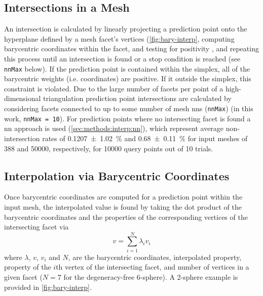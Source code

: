 \subsection{Intersections in a  Mesh}
\label{app:bary-int}
An intersection is calculated by linearly projecting a prediction point onto the hyperplane defined by a mesh facet's vertices (\cref{fig:bary-interp}, computing barycentric coordinates within the facet, and testing for positivity \cite{langerSphericalBarycentricCoordinates2006}, and repeating this process until an intersection is found or a stop condition is reached (see \texttt{nnMax} below). If the prediction point is contained within the simplex, all of the barycentric weights (i.e. coordinates) are positive. If it outside the simplex, this constraint is violated. Due to the large number of facets per point of a high-dimensional
triangulation
prediction point intersections are calculated by considering facets connected to up to some number of mesh \glspl{nn} (\texttt{nnMax}) (in this work, \texttt{nnMax = 10}). For prediction points where no intersecting facet is found
a \gls{nn} approach is used (\cref{sec:methods:interp:nn}), which represent average non-intersection rates of \SI{0.1207 \pm 1.02}{\percent} and \SI{0.68 \pm 0.11}{\percent} for input meshes of \num{388} and \num{50000}, respectively, for \num{10000} query points out of \num{10} trials.

\subsection{Interpolation via Barycentric Coordinates}
\label{app:bary-interp}

Once barycentric coordinates are computed for a prediction point within the input mesh, the interpolated value is found by taking the dot product of the barycentric coordinates and the properties of the corresponding vertices of the intersecting facet via
\begin{equation}
\label{eq:bary-interp}
v=\underset{i=1}{\overset{N}{\sum }}\lambda _i v_i
\end{equation}
where $\lambda$, $v$, $v_i$ and $N$, are the barycentric coordinates, interpolated property, property of the $i$th vertex of the intersecting facet, and number of vertices in a given facet ($N = 7$ for the degeneracy-free 6-sphere). A 2-sphere example is provided in \cref{fig:bary-interp}.

